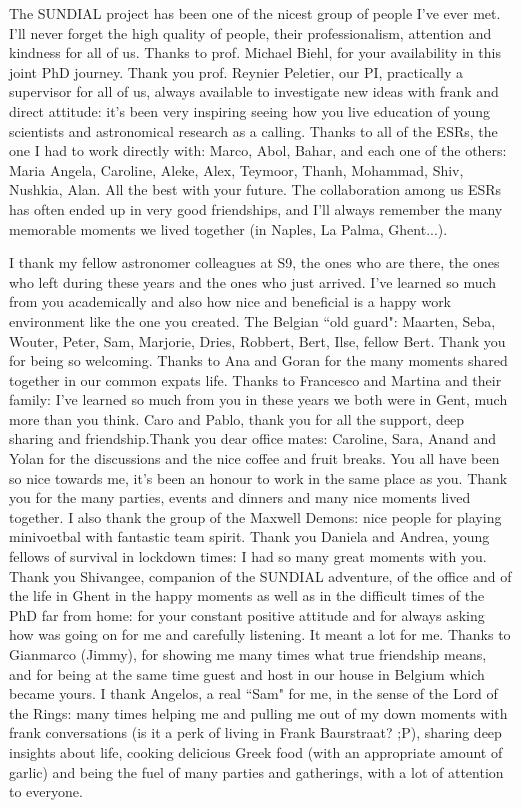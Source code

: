 The SUNDIAL project has been one of the nicest group of people I've ever met.
I'll never forget the high quality of people, their professionalism, attention and kindness for all of us. Thanks to prof. Michael Biehl, for your availability in this joint PhD journey.
Thank you prof. Reynier Peletier, our PI, practically a supervisor for all of us, always available to investigate new ideas with frank and direct attitude: %
it's been very inspiring seeing how you live education of young scientists and astronomical research as a calling.
Thanks to all of the ESRs, the one I had to work directly with: Marco, Abol, Bahar, and each one of the others: Maria Angela, Caroline, Aleke, Alex, Teymoor, Thanh, Mohammad, Shiv, Nushkia, Alan. All the best with your future.
The collaboration among us ESRs has often ended up in very good friendships, and I'll always remember the many memorable moments we lived together (in Naples, La Palma, Ghent...).

I thank my fellow astronomer colleagues at S9, the ones who are there, the ones who left during these years and the ones who just arrived.
I've learned so much from you academically and also how nice and beneficial is a happy work environment like the one you created.
The Belgian ``old guard": Maarten, Seba, Wouter, Peter, Sam, Marjorie, Dries, Robbert, Bert, Ilse, fellow Bert. Thank you for being so welcoming.
Thanks to Ana and Goran for the many moments shared together in our common expats life. Thanks to Francesco and Martina and their family: I've learned so much from you in these years we both were in Gent, much more than you think.
Caro and Pablo, thank you for all the support, deep sharing and friendship.Thank you dear office mates: Caroline, Sara, Anand and Yolan for the discussions and the nice coffee and fruit breaks.
You all have been so nice towards me, it's been an honour to work in the same place as you. Thank you for the many parties, events and dinners and many nice moments lived together.
I also thank the group of the Maxwell Demons: nice people for playing minivoetbal with fantastic team spirit.
Thank you Daniela and Andrea, young fellows of survival in lockdown times: I had so many great moments with you.
Thank you Shivangee, companion of the SUNDIAL adventure, of the office and of the life in Ghent in the happy moments as well as in the difficult times of the PhD far from home: for your constant positive attitude and for always asking how was going on for me and carefully listening. It meant a lot for me.
Thanks to Gianmarco (Jimmy), for showing me many times what true friendship means, and for being at the same time guest and host in our house in Belgium which became yours.
I thank Angelos, a real ``Sam" for me, in the sense of the Lord of the Rings: many times helping me %
and pulling me out of my down moments with frank conversations (is it a perk of living in Frank Baurstraat? ;P), sharing deep insights about life, cooking delicious Greek food (with an appropriate amount of garlic) and being the fuel of many parties and gatherings, with a lot of attention to everyone.

